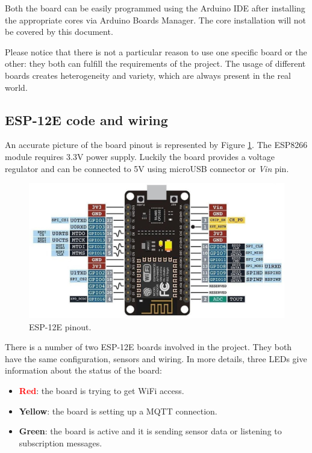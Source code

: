 Both the board can be easily programmed using the Arduino IDE after installing the appropriate cores via Arduino Boards Manager. The core installation will not be covered by this document.

Please notice that there is not a particular reason to use one specific board or the other: they both can fulfill the requirements of the project. The usage of different boards creates heterogeneity and variety, which are always present in the real world. 

\subsection{ESP-12E code and wiring}
An accurate picture of the board pinout is represented by Figure \ref{esp12_pinout}. The ESP8266 module requires 3.3V power supply. Luckily the board provides a voltage regulator and can be connected to 5V using microUSB connector or \textit{Vin} pin.

\begin{figure}[H]
	\begin{center}
		\includegraphics[width=\textwidth]{./pictures/ESP-12E_pinout.JPG}
		\caption{ESP-12E pinout.}
		\label{esp12_pinout}
	\end{center}
\end{figure}

\noindent
There is a number of two ESP-12E boards involved in the project. They both have the same configuration, sensors and wiring. In more details, three LEDs give information about the status of the board:

\begin{itemize}
	\item \textbf{\textcolor{red}{Red}}: the board is trying to get WiFi access.
	\item \textbf{\textcolor[rgb]{1,0.8,0}{Yellow}}: the board is setting up a MQTT connection.
	\item \textbf{\textcolor[rgb]{0,0.6,0}{Green}}: the board is active and it is sending sensor data or listening to subscription messages.
\end{itemize}

